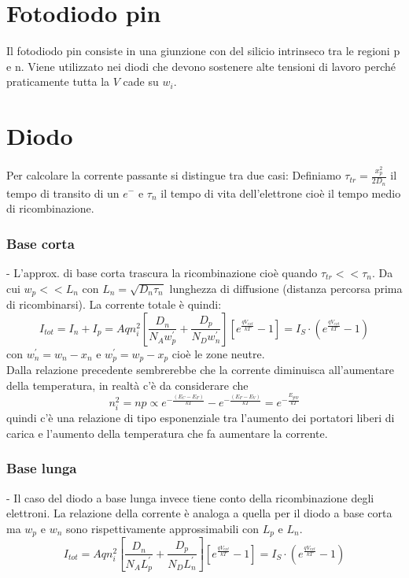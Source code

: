 \documentclass{article}
\begin{document}
\section*{Fotodiodo pin}
Il fotodiodo pin consiste in una giunzione con del silicio intrinseco tra le regioni p e n. Viene utilizzato nei diodi che devono sostenere alte tensioni di lavoro perché praticamente tutta la $V$ cade su $w_i$.

\section*{Diodo}
Per calcolare la corrente passante si distingue tra due casi:
Definiamo $\tau_{tr} = \frac{x_p^2}{2D_n}$ il tempo di transito di un $e^{-}$ e $\tau_n$ il tempo di vita dell'elettrone cioè il tempo medio di ricombinazione.

\subsubsection*{Base corta}
- L'approx. di base corta trascura la ricombinazione cioè quando $\tau_{tr}<<\tau_n$. Da cui $w_p<<L_n$ con $L_n = \sqrt{D_n \tau_n}$ lunghezza di diffusione (distanza percorsa prima di ricombinarsi).
La corrente totale è quindi:
\begin{equation*}
I_{tot} = I_n + I_p = Aqn_i^2 \left[ \frac{D_n}{N_A w_p^\prime} + \frac{D_p}{N_D w_n^\prime} \right] \left[ e^\frac{qV_{ext}}{kT} - 1 \right] = I_S \cdot \left( e^\frac{qV_{ext}}{kT} - 1 \right)
\end{equation*}
con $w_n^\prime = w_n - x_n$ e $w_p^\prime = w_p - x_p$ cioè le zone neutre.\\
Dalla relazione precedente sembrerebbe che la corrente diminuisca all'aumentare della temperatura, in realtà c'è da considerare che 
\begin{equation*}
n_i^2 = np \propto e^{-\frac{(E_C - E_F)}{kT}} - e^{-\frac{(E_F - E_V)}{kT}} = e^{-\frac{E_{gap}}{kT}}
\end{equation*}
quindi c'è una relazione di tipo esponenziale tra l'aumento dei portatori liberi di carica e l'aumento della temperatura che fa aumentare la corrente.

\subsubsection*{Base lunga}
- Il caso del diodo a base lunga invece tiene conto della ricombinazione degli elettroni. La relazione della corrente è analoga a quella per il diodo a base corta ma $w_p$ e $w_n$ sono rispettivamente approssimabili con $L_p$ e $L_n$. 
\begin{equation*}
I_{tot} = Aqn_i^2 \left[ \frac{D_n}{N_A L_p^\prime} + \frac{D_p}{N_D L_n^\prime} \right] \left[ e^\frac{qV_{ext}}{kT} - 1 \right] = I_S \cdot \left( e^\frac{qV_{ext}}{kT} - 1 \right)
\end{equation*}
\end{document}
